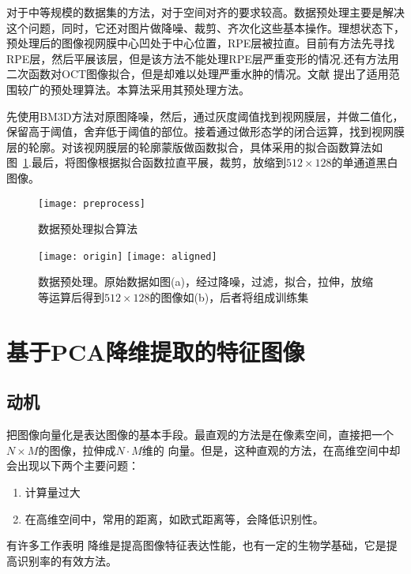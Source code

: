     对于中等规模的数据集的方法，对于空间对齐的要求较高。数据预处理主要是解决这个问题，同时，它还对图片做降噪、裁剪、齐次化这些基本操作。理想状态下，预处理后的图像视网膜中心凹处于中心位置，RPE层被拉直。目前有方法\cite{srinivasan2014fully}先寻找RPE层，然后平展该层，但是该方法不能处理RPE层严重变形的情况\cite{sun2017fully}.还有方法\cite{liu2011automated}用二次函数对OCT图像拟合，但是却难以处理严重水肿的情况。文献 提出了适用范围较广的预处理算法。本算法采用其预处理方法。

    先使用BM3D方法对原图降噪\cite{dabov2007image}，然后，通过灰度阈值找到视网膜层，并做二值化，保留高于阈值，舍弃低于阈值的部位。接着通过做形态学的闭合运算，找到视网膜层的轮廓。对该视网膜层的轮廓蒙版做函数拟合，具体采用的拟合函数算法如图~\ref{fig:preprocess}.最后，将图像根据拟合函数拉直平展，裁剪，放缩到$512\times 128$的单通道黑白图像。
    \begin{figure}[htb] %
      \centering
      \texttt{[image: preprocess]}
      \caption{数据预处理拟合算法}
      \label{fig:preprocess}
    \end{figure}

    \begin{figure}[htb]
      \centering%
      \subcaptionbox{\label{fig:origin}} %
        {\texttt{[image: origin]}} %
      \subcaptionbox{\label{fig:aligned}} %
        {\texttt{[image: aligned]}} \\
      \caption[数据预处理]{数据预处理。原始数据如图(a)，经过降噪，过滤，拟合，拉伸，放缩等运算后得到$512\times 128$的图像如(b)，后者将组成训练集} 
      \label{fig:origin-pre}
    \end{figure}


\section{基于PCA降维提取的特征图像}
\label{sec:pcaDR}
    \subsection{动机}
    把图像向量化是表达图像的基本手段。最直观的方法是在像素空间，直接把一个$N \times M$的图像，拉伸成$N\cdot M$维的 向量。但是，这种直观的方法，在高维空间中却会出现以下两个主要问题：
    \begin{enumerate}
        \item 计算量过大
        \item 在高维空间中，常用的距离，如欧式距离等，会降低识别性。
    \end{enumerate}
    有许多工作表明%
    降维是提高图像特征表达性能，也有一定的生物学基础\cite{olshausen1997sparse}，它是提高识别率的有效方法。
    


